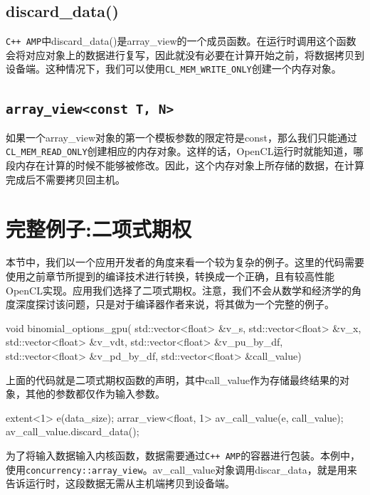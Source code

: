 \subsection{discard\_data()}

\texttt{C++ AMP}中discard\_\allowbreak{}data()是array\_\allowbreak{}view的一个成员函数。在运行时调用这个函数会将对应对象上的数据进行复写，因此就没有必要在计算开始之前，将数据拷贝到设备端。这种情况下，我们可以使用\texttt{CL\_MEM\_WRITE\_ONLY}创建一个内存对象。

\subsection{\texttt{array\_view\textless{}const T, N\textgreater{}}}

如果一个array\_\allowbreak{}view对象的第一个模板参数的限定符是const，那么我们只能通过\texttt{CL\_MEM\_READ\_ONLY}创建相应的内存对象。这样的话，OpenCL运行时就能知道，哪段内存在计算的时候不能够被修改。因此，这个内存对象上所存储的数据，在计算完成后不需要拷贝回主机。



\section{完整例子:二项式期权}

本节中，我们以一个应用开发者的角度来看一个较为复杂的例子。这里的代码需要使用之前章节所提到的编译技术进行转换，转换成一个正确，且有较高性能OpenCL实现。应用我们选择了二项式期权。注意，我们不会从数学和经济学的角度深度探讨该问题，只是对于编译器作者来说，将其做为一个完整的例子。

\begin{codebox}[cpp]
void binomial_options_gpu(
  std::vector<float> &v_s,
  std::vector<float> &v_x,
  std::vector<float> &v_vdt,
  std::vector<float> &v_pu_by_df,
  std::vector<float> &v_pd_by_df,
  std::vector<float> &call_value)
\end{codebox}

上面的代码就是二项式期权函数的声明，其中call\_\allowbreak{}value作为存储最终结果的对象，其他的参数都仅作为输入参数。

\begin{codebox}[cpp]
extent<1> e(data_size);
arrar_view<float, 1> av_call_value(e, call_value);
av_call_value.discard_data();
\end{codebox}

为了将输入数据输入内核函数，数据需要通过\texttt{C++ AMP}的容器进行包装。本例中，使用\texttt{concurrency::array\_view}。av\_\allowbreak{}call\_\allowbreak{}value对象调用discar\_\allowbreak{}data，就是用来告诉运行时，这段数据无需从主机端拷贝到设备端。

